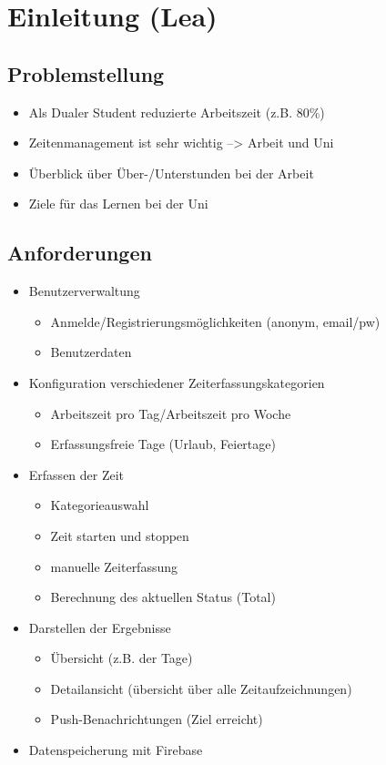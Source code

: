 \section{Einleitung (Lea)}\label{sec:einleitung}
\subsection{Problemstellung}
\begin{itemize}
    \item Als Dualer Student reduzierte Arbeitszeit (z.B. 80\%)
    \item Zeitenmanagement ist sehr wichtig --> Arbeit und Uni
    \item Überblick über Über-/Unterstunden bei der Arbeit
    \item Ziele für das Lernen bei der Uni
\end{itemize}

\subsection{Anforderungen}
\begin{itemize}
    \item Benutzerverwaltung
    \begin{itemize}
        \item Anmelde/Registrierungsmöglichkeiten (anonym, email/pw)
        \item Benutzerdaten
    \end{itemize}
    \item Konfiguration verschiedener Zeiterfassungskategorien
    \begin{itemize}
        \item Arbeitszeit pro Tag/Arbeitszeit pro Woche
        \item Erfassungsfreie Tage (Urlaub, Feiertage)
    \end{itemize}
    \item Erfassen der Zeit
    \begin{itemize}
        \item Kategorieauswahl
        \item Zeit starten und stoppen
        \item manuelle Zeiterfassung
        \item Berechnung des aktuellen Status (Total)
    \end{itemize}
    \item Darstellen der Ergebnisse
    \begin{itemize}
        \item Übersicht (z.B. der Tage)
        \item Detailansicht (übersicht über alle Zeitaufzeichnungen)
        \item Push-Benachrichtungen (Ziel erreicht)
    \end{itemize}
    \item Datenspeicherung mit Firebase
\end{itemize}

